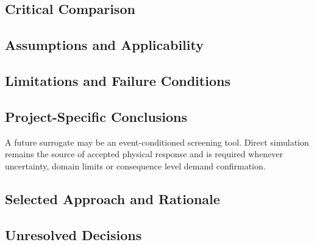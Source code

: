 \subsection{Critical Comparison}
\label{sec:res-ml-sur-critical-comparison}


\subsection{Assumptions and Applicability}
\label{sec:res-ml-sur-assumptions}


\subsection{Limitations and Failure Conditions}
\label{sec:res-ml-sur-limitations}


\subsection{Project-Specific Conclusions}
\label{sec:res-ml-sur-conclusions}

A future surrogate may be an event-conditioned screening tool. Direct
simulation remains the source of accepted physical response and is
required whenever uncertainty, domain limits or consequence level
demand confirmation.

\subsection{Selected Approach and Rationale}
\label{sec:res-ml-sur-selected-approach}


\subsection{Unresolved Decisions}
\label{sec:res-ml-sur-unresolved-decisions}



